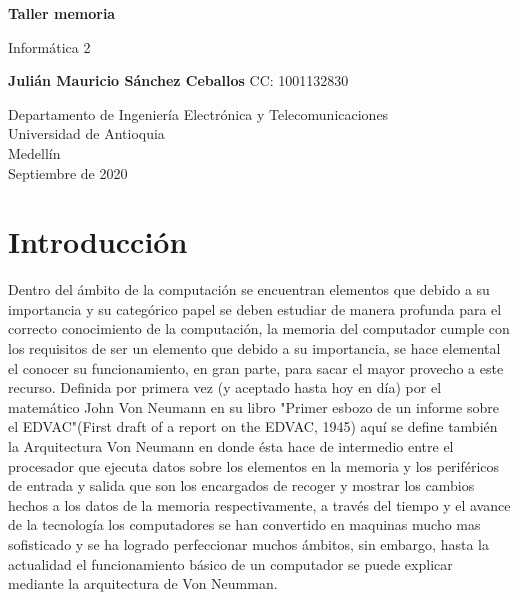 \documentclass{article}
\begin{document}
\begin{titlepage}
    \begin{center}
        \vspace*{1cm}
            
        \Huge
        \textbf{Taller memoria}
            
        \vspace{0.5cm}
        \LARGE
        Informática 2
            
        \vspace{1.5cm}
            
        \textbf{Julián Mauricio Sánchez Ceballos}
         \newline 
            CC: 1001132830   
        \vfill
            
        \vspace{0.8cm}
            
        \Large
        Departamento de Ingeniería Electrónica y Telecomunicaciones\\
        Universidad de Antioquia\\
        Medellín\\
        Septiembre de 2020
            
    \end{center}
\end{titlepage}
\tableofcontents

\newpage
\section{Introducción}
Dentro del ámbito de la computación se encuentran elementos que debido a su importancia y su categórico papel se deben estudiar de manera profunda para el correcto conocimiento de la computación, la memoria del computador cumple con los requisitos de ser un elemento que debido a su importancia, se hace elemental el conocer su funcionamiento, en gran parte, para sacar el mayor provecho a este recurso. Definida por primera vez (y aceptado hasta hoy en día) por el matemático John Von Neumann en su libro "Primer esbozo de un informe sobre el EDVAC"(First draft of a report on the EDVAC, 1945) aquí se define también la Arquitectura Von Neumann en donde ésta hace de intermedio entre el procesador que ejecuta datos sobre los elementos en la memoria y los periféricos de entrada y salida que son los encargados de recoger y mostrar los cambios hechos a los datos de la memoria respectivamente, a través del tiempo y el avance de la tecnología los computadores se han convertido en maquinas mucho mas sofisticado y se ha logrado perfeccionar muchos ámbitos, sin embargo, hasta la actualidad el funcionamiento básico de un computador se puede explicar mediante la arquitectura de Von Neumman\cite{barcelo}.\newline
\end{document}
